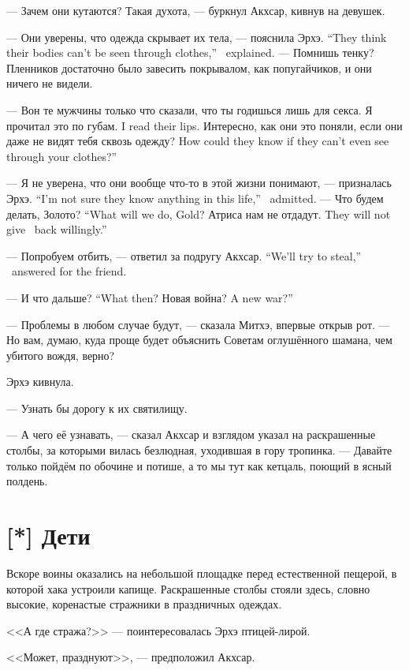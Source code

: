 --- Зачем они кутаются?
Такая духота, --- буркнул Акхсар, кивнув на девушек.

{--- Они уверены, что одежда скрывает их тела, --- пояснила Эрхэ.}
{``They think their bodies can't be seen through clothes,'' \Oerchoe\ explained.}
--- Помнишь тенку?
Пленников достаточно было завесить покрывалом, как попугайчиков, и они ничего не видели.

--- Вон те мужчины только что сказали, что ты годишься лишь для секса.
{Я прочитал это по губам.}
{I read their lips.}
{Интересно, как они это поняли, если они даже не видят тебя сквозь одежду?}
{How could they know if they can't even see through your clothes?''}

{--- Я не уверена, что они вообще что-то в этой жизни понимают, --- призналась Эрхэ.}
{``I'm not sure they know anything in this life,'' \Oerchoe\ admitted.}
{--- Что будем делать, Золото?}
{``What will we do, Gold?}
{Атриса нам не отдадут.}
{They will not give \Aatris\ back willingly.''}

{--- Попробуем отбить, --- ответил за подругу Акхсар.}
{``We'll try to steal,'' \Akchsar\ answered for the friend.}

{--- И что дальше?}
{``What then?}
{Новая война?}
{A new war?''}

--- Проблемы в любом случае будут, --- сказала Митхэ, впервые открыв рот.
--- Но вам, думаю, куда проще будет объяснить Советам оглушённого шамана, чем убитого вождя, верно?

Эрхэ кивнула.

--- Узнать бы дорогу к их святилищу.

--- А чего её узнавать, --- сказал Акхсар и взглядом указал на раскрашенные столбы, за которыми вилась безлюдная, уходившая в гору тропинка.
--- Давайте только пойдём по обочине и потише, а то мы тут как кетцаль, поющий в ясный полдень.

\section{[*] Дети}

Вскоре воины оказались на небольшой площадке перед естественной пещерой, в которой хака устроили капище.
Раскрашенные столбы стояли здесь, словно высокие, коренастые стражники в праздничных одеждах.

<<А где стража?>> --- поинтересовалась Эрхэ птицей-лирой.

<<Может, празднуют>>, --- предположил Акхсар.

